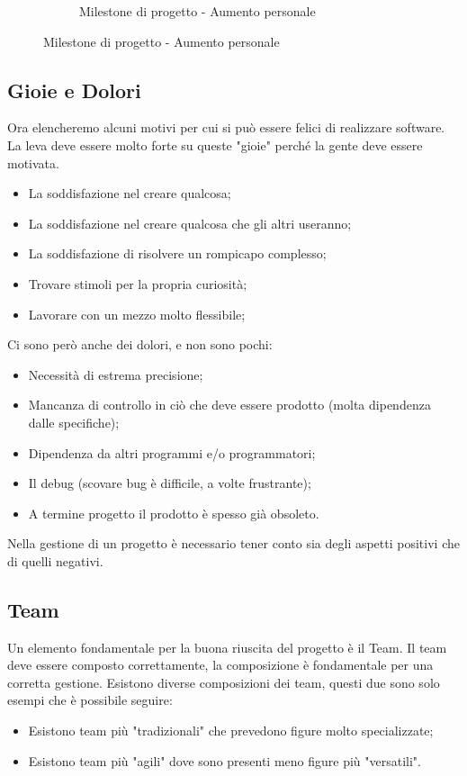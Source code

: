 \begin{figure}[H]
\begin{subfigure}{.32 \textwidth}
		\caption{Milestone di progetto - Aumento personale}
	\end{subfigure}%
\end{figure}
\subsection{Gioie e Dolori}
Ora elencheremo alcuni motivi per cui si può essere felici di realizzare software. La leva deve essere molto forte su queste "gioie" perché la gente deve essere motivata.
\begin{itemize}
	\item La soddisfazione nel creare qualcosa;
	\item La soddisfazione nel creare qualcosa che gli altri useranno;
	\item La soddisfazione di risolvere un rompicapo complesso;
	\item Trovare stimoli per la propria curiosità;
	\item Lavorare con un mezzo molto flessibile;
\end{itemize}
Ci sono però anche dei dolori, e non sono pochi:
\begin{itemize}
	\item Necessità di estrema precisione;
	\item Mancanza di controllo in ciò che deve essere prodotto (molta dipendenza dalle specifiche);
	\item Dipendenza da altri programmi e/o programmatori;
	\item Il debug (scovare bug è difficile, a volte frustrante);
	\item A termine progetto il prodotto è spesso già obsoleto.
\end{itemize}
Nella gestione di un progetto è necessario tener conto sia degli aspetti positivi che di quelli negativi.
\subsection{Team}
Un elemento fondamentale per la buona riuscita del progetto è il Team. Il team deve essere composto correttamente, la composizione è fondamentale per una corretta gestione. Esistono diverse composizioni dei team, questi due sono solo esempi che è possibile seguire:
\begin{itemize}
	\item Esistono team più "tradizionali" che prevedono figure molto specializzate;
	\item Esistono team più "agili" dove sono presenti meno figure più "versatili".
\end{itemize}
